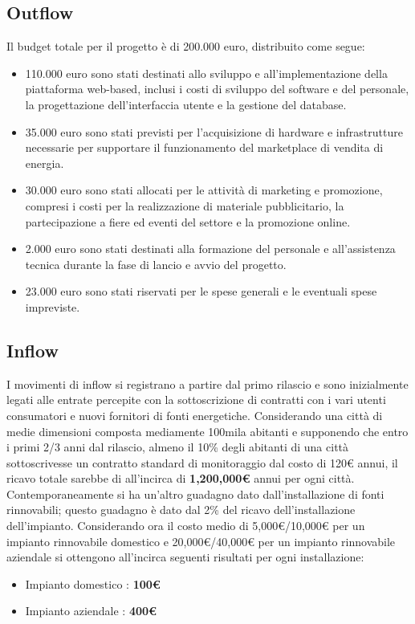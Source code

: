 \documentclass[oneside]{book}
\begin{document}
\subsection{Outflow}
Il budget totale per il progetto è di 200.000 euro, distribuito come segue:
\begin{itemize}
    \item 110.000 euro sono stati destinati allo sviluppo e all'implementazione della piattaforma web-based, inclusi i costi di sviluppo del software e del personale, la progettazione dell'interfaccia utente e la gestione del database.

    \item 35.000 euro sono stati previsti per l'acquisizione di hardware e infrastrutture necessarie per supportare il funzionamento del marketplace di vendita di energia.

    \item 30.000 euro sono stati allocati per le attività di marketing e promozione, compresi i costi per la realizzazione di materiale pubblicitario, la partecipazione a fiere ed eventi del settore e la promozione online.

    \item 2.000 euro sono stati destinati alla formazione del personale e all'assistenza tecnica durante la fase di lancio e avvio del progetto.

    \item 23.000 euro sono stati riservati per le spese generali e le eventuali spese impreviste.
\end{itemize}

\subsection{Inflow}
I movimenti di inflow si registrano a partire dal primo rilascio e sono inizialmente legati alle entrate percepite con la sottoscrizione di contratti con i vari utenti consumatori e nuovi fornitori di fonti energetiche.
\newline Considerando una città di medie dimensioni composta mediamente 100mila abitanti e supponendo che entro i primi 2/3 anni dal rilascio, almeno il 10\% degli abitanti di una città sottoscrivesse un contratto standard di monitoraggio dal costo di 120€ annui, il ricavo totale sarebbe di all'incirca di \textbf{1,200,000€} annui per ogni città.
Contemporaneamente si ha un'altro guadagno dato dall'installazione di fonti rinnovabili; questo guadagno è dato dal 2\% del ricavo dell'installazione dell'impianto. 
\newline Considerando ora il costo medio di 5,000€/10,000€ per un impianto rinnovabile domestico e 20,000€/40,000€ per un impianto rinnovabile aziendale si ottengono all'incirca seguenti risultati per ogni installazione:
\begin{itemize}
    \item Impianto domestico : \textbf{100€}
    \item Impianto aziendale : \textbf{400€}
\end{itemize}
\end{document}
